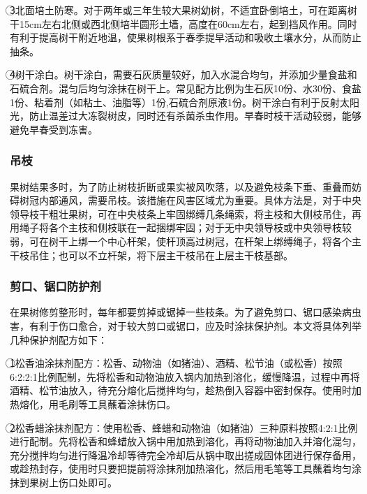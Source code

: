 \documentclass{ctexbook}
\begin{document}
\textcircled{3}北面培土防寒。对于两年或三年生较大果树幼树，不适宜卧倒培土，可在距离树干15cm左右北侧或西北侧培半圆形土墙，高度在60cm左右，起到挡风作用。同时有利于提高树干附近地温，使果树根系于春季提早活动和吸收土壤水分，从而防止抽条。

\textcircled{4}树干涂白。树干涂白，需要石灰质量较好，加入水混合均匀，并添加少量食盐和石硫合剂。混匀后均匀涂抹在树干上。常见配方比例为生石灰10份、水30份、食盐1份、粘着剂（如粘土、油脂等）1份,石硫合剂原液1份。树干涂白有利于反射太阳光，防止温差过大冻裂树皮，同时还有杀菌杀虫作用。早春时枝干活动较弱，能够避免早春受到冻害。
\subsubsection{吊枝}
果树结果多时，为了防止树枝折断或果实被风吹落，以及避免枝条下垂、重叠而妨碍树冠内部通风，需要吊枝。该措施在风害区域尤为重要。具体方法是，对于中央领导枝干粗壮果树，可在中央枝条上牢固绑缚几条绳索，将主枝和大侧枝吊住，再用绳子将各个主枝和侧枝联在一起捆绑牢固；对于无中央领导枝或中央领导枝较弱，可在树干上绑一个中心杆架，使杆顶高过树冠，在杆架上绑缚绳子，将各个主干枝吊住；也可以不立杆架，将下层主干枝吊在上层主干枝基部。
\subsubsection{剪口、锯口防护剂}
在果树修剪整形时，每年都要剪掉或锯掉一些枝条。为了避免剪口、锯口感染病虫害，有利于伤口愈合，对于较大剪口或锯口，应及时涂抹保护剂。本文将具体列举几种保护剂配方如下：

\textcircled{1}松香油涂抹剂配方：松香、动物油（如猪油）、酒精、松节油（或松香）按照6:2:2:1比例配制，先将松香和动物油放入锅内加热到溶化，缓慢降温，过程中再将酒精、松节油放入，待充分熔化后搅拌均匀，趁热倒入容器中密封保存。使用时加热熔化，用毛刷等工具蘸着涂抹伤口。

\textcircled{2}松香蜡涂抹剂配方：使用松香、蜂蜡和动物油（如猪油）三种原料按照4:2:1比例进行配制。先将松香和蜂蜡放入锅中用加热到溶化，再将动物油加入并溶化混匀，充分搅拌均匀进行降温冷却等待完全冷却后从锅中取出搓成固体团进行保存备用，或趁热封存，使用时只要把提前将涂抹剂加热溶化，然后用毛笔等工具蘸着均匀涂抹到果树上伤口处即可。
\end{document}
